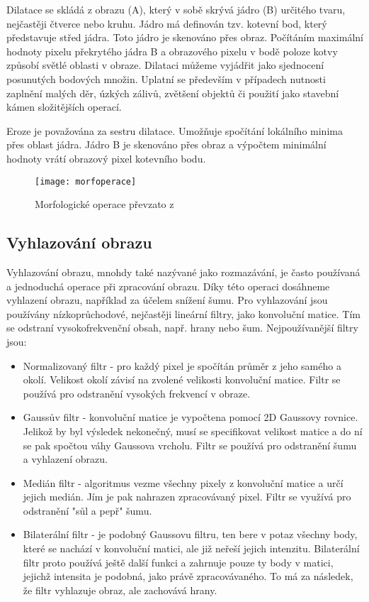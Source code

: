 Dilatace se skládá z obrazu (A), který v sobě skrývá jádro (B) určitého tvaru, nejčastěji čtverce nebo kruhu. Jádro má definován tzv. kotevní bod, který představuje střed jádra. Toto jádro je skenováno přes obraz. Počítáním maximální hodnoty pixelu překrytého jádra B a obrazového pixelu v bodě poloze kotvy způsobí světlé oblasti v obraze.  Dilataci můžeme vyjádřit jako sjednocení posunutých bodových množin. Uplatní se především v případech nutnosti zaplnění malých děr, úzkých zálivů, zvětšení objektů či použití jako stavební kámen složitějších operací. \cite{eroding}

Eroze je považována za sestru dilatace. Umožňuje spočítání lokálního minima přes oblast jádra. Jádro B je skenováno přes obraz a výpočtem minimální hodnoty vrátí obrazový pixel kotevního bodu.\cite{eroding}

\begin{figure}[h]
	\texttt{[image: morfoperace]}
	\centering
	\caption{Morfologické operace převzato z \cite{eroding}}\label{fig:morfoperace}
\end{figure}

\subsection{Vyhlazování obrazu}
Vyhlazování obrazu, mnohdy také nazývané jako rozmazávání, je často používaná a jednoduchá operace při zpracování obrazu. Díky této operaci dosáhneme vyhlazení obrazu, například za účelem snížení šumu. Pro vyhlazování jsou používány nízkoprůchodové, nejčastěji lineární filtry, jako konvoluční matice. Tím se odstraní vysokofrekvenční obsah, např. hrany nebo šum.\cite{opencv:} Nejpoužívanější filtry jsou:

\begin{itemize}
	\item Normalizovaný filtr - pro každý pixel je spočítán průměr z jeho samého a okolí. Velikost okolí závisí na zvolené velikosti konvoluční matice. Filtr se používá pro odstranění vysokých frekvencí v obraze.\cite{opencv:}
	\item Gaussův filtr - konvoluční matice je vypočtena pomocí 2D Gaussovy rovnice. Jelikož by byl výsledek nekonečný, musí se specifikovat velikost matice a do ní se pak spočtou váhy Gaussova vrcholu. Filtr se používá pro odstranění šumu a vyhlazení obrazu.\cite{opencv:}
	\item Medián filtr - algoritmus vezme všechny pixely z konvoluční matice a určí jejich medián. Jím je pak nahrazen zpracovávaný pixel. Filtr se využívá pro odstranění "sůl a pepř" šumu.\cite{opencv:}
	\item Bilaterální filtr - je podobný Gaussovu filtru, ten bere v potaz všechny body, které se nachází v konvoluční matici, ale již neřeší jejich intenzitu. Bilaterální filtr proto používá ještě další funkci a zahrnuje pouze ty body v matici, jejichž intensita je podobná, jako právě zpracovávaného. To má za následek, že filtr vyhlazuje obraz, ale zachovává hrany. \cite{opencv:}
\end{itemize}

